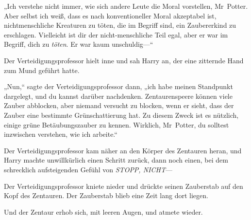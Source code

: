 „Ich verstehe nicht immer, wie sich andere Leute die Moral vorstellen, Mr~Potter. Aber selbst ich weiß, dass es nach konventioneller Moral akzeptabel ist, nichtmenschliche Kreaturen zu töten, die im Begriff sind, ein Zaubererkind zu erschlagen. Vielleicht ist dir der nicht-menschliche Teil egal, aber er war im Begriff, dich zu \emph{töten}. Er war kaum unschuldig—“

Der Verteidigungsprofessor hielt inne und sah Harry an, der eine zitternde Hand zum Mund geführt hatte.

„Nun,“ sagte der Verteidigungsprofessor dann, „ich habe meinen Standpunkt dargelegt, und du kannst darüber nachdenken. Zentaurenspeere können viele Zauber abblocken, aber niemand versucht zu blocken, wenn er sieht, dass der Zauber eine bestimmte Grünschattierung hat. Zu diesem Zweck ist es nützlich, einige grüne Betäubungszauber zu kennen. Wirklich, Mr~Potter, du solltest inzwischen verstehen, wie ich arbeite.“

Der Verteidigungsprofessor kam näher an den Körper des Zentauren heran, und Harry machte unwillkürlich einen Schritt zurück, dann noch einen, bei dem schrecklich aufsteigenden Gefühl von \emph{STOPP, NICHT}—

Der Verteidigungsprofessor kniete nieder und drückte seinen Zauberstab auf den Kopf des Zentauren.
%
Der Zauberstab blieb eine Zeit lang dort liegen.

Und der Zentaur erhob sich, mit leeren Augen, und atmete wieder.

